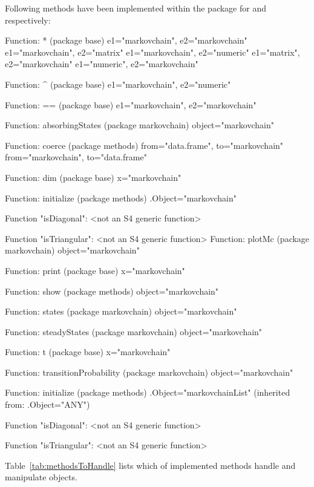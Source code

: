 \documentclass[nojss]{jss}
\begin{document}
Following methods have been implemented within the package for  and  respectively:

\begin{Schunk}
\begin{Soutput}
Function: * (package base)
e1="markovchain", e2="markovchain"
e1="markovchain", e2="matrix"
e1="markovchain", e2="numeric"
e1="matrix", e2="markovchain"
e1="numeric", e2="markovchain"

Function: ^ (package base)
e1="markovchain", e2="numeric"

Function: == (package base)
e1="markovchain", e2="markovchain"

Function: absorbingStates (package markovchain)
object="markovchain"

Function: coerce (package methods)
from="data.frame", to="markovchain"
from="markovchain", to="data.frame"

Function: dim (package base)
x="markovchain"

Function: initialize (package methods)
.Object="markovchain"


Function "isDiagonal":
 <not an S4 generic function>

Function "isTriangular":
 <not an S4 generic function>
Function: plotMc (package markovchain)
object="markovchain"

Function: print (package base)
x="markovchain"

Function: show (package methods)
object="markovchain"

Function: states (package markovchain)
object="markovchain"

Function: steadyStates (package markovchain)
object="markovchain"

Function: t (package base)
x="markovchain"

Function: transitionProbability (package markovchain)
object="markovchain"
\end{Soutput}
\begin{Soutput}
Function: initialize (package methods)
.Object="markovchainList"
    (inherited from: .Object="ANY")


Function "isDiagonal":
 <not an S4 generic function>

Function "isTriangular":
 <not an S4 generic function>
\end{Soutput}
\end{Schunk}

Table~\ref{tab:methodsToHandle} lists which of implemented methods handle and manipulate  objects.
\end{document}
